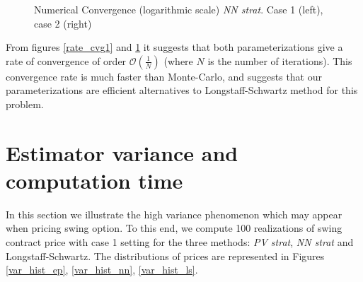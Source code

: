 \documentclass{article}
\numberwithin{equation}{section}
\begin{document}
\begin{figure}[ht!]
\begin{subfigure}[b]{0.45\textwidth}
\end{subfigure}
\caption{Numerical Convergence (logarithmic scale) \textit{NN strat}. Case 1 (left), case 2 (right)}
\label{rate_cvg2}
\end{figure}


From figures \ref{rate_cvg1} and \ref{rate_cvg2} it suggests that both parameterizations give a rate of convergence of order $\mathcal{O}(\frac{1}{N})$ (where $N$ is the number of iterations). This convergence rate is much faster than Monte-Carlo, and suggests that our parameterizations are efficient alternatives to Longstaff-Schwartz method for this problem.

\section{Estimator variance and computation time}
\label{add_res}

\indent

In this section we illustrate the high variance phenomenon which may appear when pricing swing option. To this end, we compute 100 realizations of swing contract price with case 1 setting for the three methods: \textit{PV strat}, \textit{NN strat} and Longstaff-Schwartz. The distributions of prices are represented in Figures \ref{var_hist_ep}, \ref{var_hist_nn}, \ref{var_hist_ls}.
\end{document}
